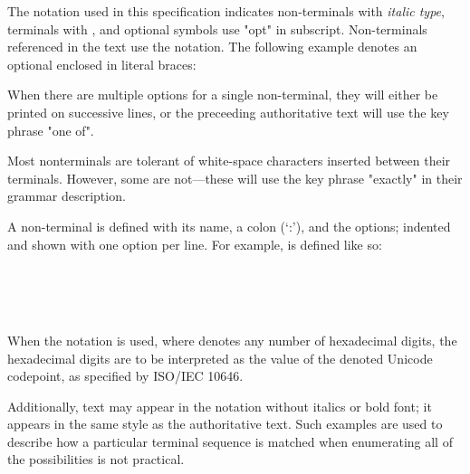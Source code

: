 


\specsubitem
The notation used in this specification indicates non-terminals with
\textit{italic type}, terminals with , and optional
symbols use "opt" in subscript. Non-terminals referenced in the text use the
 notation. The following example denotes an optional
 enclosed in literal braces:

\begin{grammar}
\terminal{\{}  \terminal{\}}
\end{grammar}

\specsubitem
When there are multiple options for a single non-terminal, they will either be
printed on successive lines, or the preceeding authoritative text will use the
key phrase "one of".

\specsubitem
Most nonterminals are tolerant of white-space characters inserted between their
terminals. However, some are not---these will use the key phrase "exactly" in
their grammar description.

\specsubitem
A non-terminal is defined with its name, a colon (`:'), and the options;
indented and shown with one option per line. For example,
 is defined like so:

\begin{grammar}
 \\
	 \terminal{;} \\
	 \terminal{;}  \\
\end{grammar}

\specsubitem
When the  notation is used, where  denotes any number of
hexadecimal digits, the hexadecimal digits are to be interpreted as the value of
the denoted Unicode codepoint, as specified by ISO/IEC 10646.


\specsubitem
Additionally, text may appear in the notation without italics or bold font; it
appears in the same style as the authoritative text. Such examples are used to
describe how a particular terminal sequence is matched when enumerating all of
the possibilities is not practical.

\begin{grammar}
 \\
	 \\
\end{grammar}








